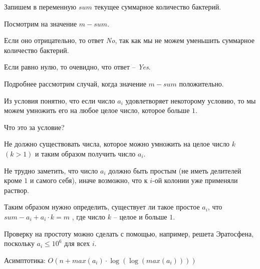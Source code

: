 \solutionSection

Запишем в переменную $sum$ текущее суммарное количество бактерий.

Посмотрим на значение $m - sum$.

Если оно отрицательно, то ответ \textit{No}, так как мы не можем уменьшить
суммарное количество бактерий.

Если равно нулю, то очевидно, что ответ – \textit{Yes}.

Подробнее рассмотрим случай, когда значение $m - sum$ положительно.

Из условия понятно, что если число $a_i$ удовлетворяет некоторому условию,
то мы можем умножить его на любое целое число, которое больше $1$.

Что это за условие?

Не должно существовать числа, которое можно умножить на целое число $k$ \linebreak
$(k > 1)$ и таким образом получить число $a_i$.

Не трудно заметить, что число $a_i$ должно быть простым
(не иметь делителей кроме $1$ и самого себя),
иначе возможно, что к $i$-ой колонии уже применяли раствор.

Таким образом нужно определить, существует ли такое простое $a_i$, что
$sum - a_i + a_i \cdot k = m$ , где число $k$ – целое и больше $1$.

Проверку на простоту можно сделать с помощью, например, решета Эратосфена,
поскольку $a_i \le 10^6$ для всех $i$.

Асимптотика: $O(n + max(a_i) \cdot \log (\log (max(a_i))))$

\codeExample


